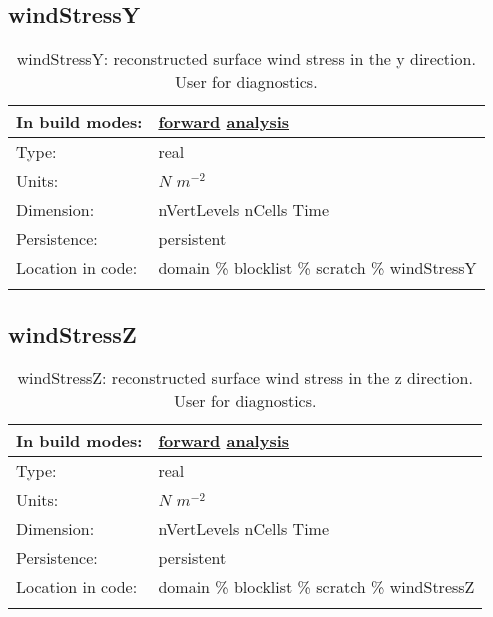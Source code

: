 \subsection[windStressY]{windStressY}
\label{subsec:var_sec_scratch_windStressY}
\begin{center}
\begin{longtable}{| p{2.0in} | p{4.0in} |}
        \hline 
        In build modes: & \hyperref[subsec:forward_var_tab_scratch]{forward} \hyperref[subsec:analysis_var_tab_scratch]{analysis} \\
        \hline 
        Type: & real \\
        \hline 
        Units: & $N$ $m^{-2}$ \\
        \hline 
        Dimension: & nVertLevels nCells Time \\
        \hline 
        Persistence: & persistent \\
        \hline 
		 Location in code: & domain \% blocklist \% scratch \% windStressY \\
		 \hline 
    \caption{windStressY: reconstructed surface wind stress in the y direction. User for diagnostics.}
\end{longtable}
\end{center}
\subsection[windStressZ]{windStressZ}
\label{subsec:var_sec_scratch_windStressZ}
\begin{center}
\begin{longtable}{| p{2.0in} | p{4.0in} |}
        \hline 
        In build modes: & \hyperref[subsec:forward_var_tab_scratch]{forward} \hyperref[subsec:analysis_var_tab_scratch]{analysis} \\
        \hline 
        Type: & real \\
        \hline 
        Units: & $N$ $m^{-2}$ \\
        \hline 
        Dimension: & nVertLevels nCells Time \\
        \hline 
        Persistence: & persistent \\
        \hline 
		 Location in code: & domain \% blocklist \% scratch \% windStressZ \\
		 \hline 
    \caption{windStressZ: reconstructed surface wind stress in the z direction. User for diagnostics.}
\end{longtable}
\end{center}

